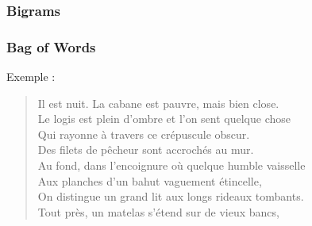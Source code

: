 \begin{frame}
  \frametitle{Bigrams}
\end{frame}

\begin{frame}[t]
  \frametitle{Bag of Words}
  \vspace{1cm}
  Exemple :

  \begin{quote}
    Il est nuit. La cabane est pauvre, mais bien close.\\
    Le logis est plein d'ombre et l'on sent quelque chose\\
    Qui rayonne à travers ce crépuscule obscur.\\
    Des filets de pêcheur sont accrochés au mur.\\
    Au fond, dans l'encoignure où quelque humble vaisselle\\
    Aux planches d'un bahut vaguement étincelle,\\
    On distingue un grand lit aux longs rideaux tombants.\\
    Tout près, un matelas s'étend sur de vieux bancs,\\
  \end{quote}
\end{frame}

